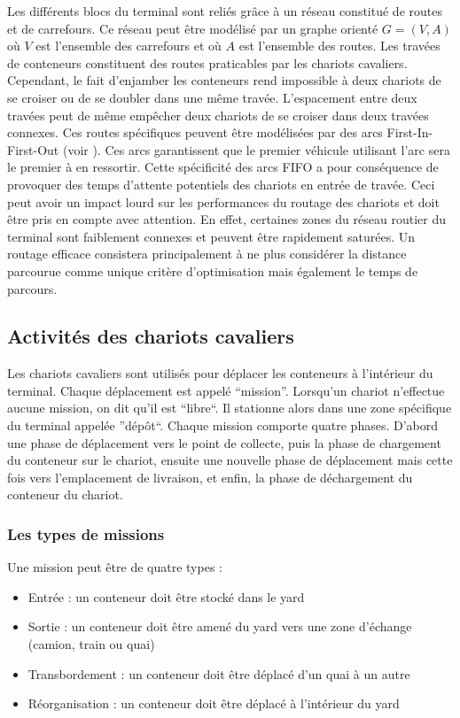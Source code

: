 Les différents blocs du terminal sont reliés grâce à un réseau constitué de routes et de carrefours. Ce réseau peut être modélisé par un graphe orienté $G=(V,A)$ où $V$ est l'ensemble des carrefours et où $A$ est l'ensemble des routes. Les travées de conteneurs constituent des routes praticables par les chariots cavaliers. Cependant, le fait d'enjamber les conteneurs rend impossible à deux chariots de se croiser ou de se doubler dans une même travée. L'espacement entre deux travées peut de même empêcher deux chariots de se croiser dans deux travées connexes. Ces routes spécifiques peuvent être modélisées par des arcs First-In-First-Out (voir \cite{Orda1990}). Ces arcs garantissent que le premier véhicule utilisant l'arc sera le premier à en ressortir.
Cette spécificité des arcs FIFO a pour conséquence de provoquer des temps d'attente potentiels des chariots en entrée de travée. Ceci peut avoir un impact lourd sur les performances du routage des chariots et doit être pris en compte avec attention. En effet, certaines zones du réseau routier du terminal sont faiblement connexes et peuvent être rapidement saturées. Un routage efficace consistera principalement à ne plus considérer la distance parcourue comme unique critère d'optimisation mais également le temps de parcours.

\subsection{Activités des chariots cavaliers}

Les chariots cavaliers sont utilisés pour déplacer les conteneurs à l'intérieur du terminal. Chaque déplacement est appelé ``mission''. Lorsqu'un chariot n'effectue aucune mission, on dit qu'il est ``libre``. Il stationne alors dans une zone spécifique du terminal appelée ''dépôt``. 
Chaque mission comporte quatre phases. D'abord une phase de déplacement vers le point de collecte, puis la phase de chargement du conteneur sur le chariot, ensuite une nouvelle phase de déplacement mais cette fois vers l'emplacement de livraison, et enfin, la phase de déchargement du conteneur du chariot.

\subsubsection{Les types de missions}
Une mission peut être de quatre types :
\begin{itemize}
 \item Entrée : un conteneur doit être stocké dans le yard
 \item Sortie : un conteneur doit être amené du yard vers une zone d'échange (camion, train ou quai)
 \item Transbordement : un conteneur doit être déplacé d'un quai à un autre
 \item Réorganisation : un conteneur doit être déplacé à l'intérieur du yard
\end{itemize}

